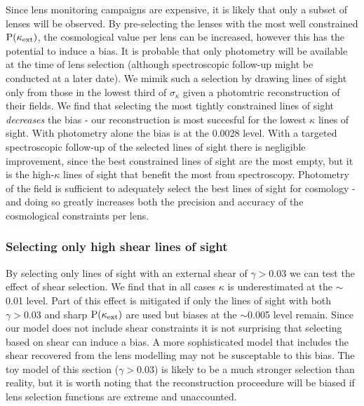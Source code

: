 \documentclass[useAMS,usenatbib]{mn2e}
\begin{document}
Since lens monitoring campaigns are expensive, it is likely that only a subset of lenses will be observed. By pre-selecting the lenses with the most well constrained ${\rm P}(\kappa_{\rm ext})$, the cosmological value per lens can be increased, however this has the potential to induce a bias. It is probable that only photometry will be available at the time of lens selection (although spectroscopic follow-up might be conducted at a later date). We mimik such a selection by drawing lines of sight only from those in the lowest third of $\sigma_{\kappa}$ given a photomtric reconstruction of their fields. We find that selecting the most tightly constrained lines of sight {\it decreases} the bias - our reconstruction is most succesful for the lowest $\kappa$ lines of sight. With photometry alone the bias is at the 0.0028 level. With a targeted spectroscopic follow-up of the selected lines of sight there is negligible improvement, since the best constrained lines of sight are the most empty, but it is the high-$\kappa$ lines of sight that benefit the most from spectroscopy. Photometry of the field is sufficient to adequately select the best lines of sight for cosmology - and doing so greatly increases both the precision and accuracy of the cosmological constraints per lens.

\subsubsection{Selecting only high shear lines of sight}

By selecting only lines of sight with an external shear of $\gamma>0.03$ we can test the effect of shear selection. We find that in all cases $\kappa$ is underestimated at the $\sim$0.01 level. Part of this effect is mitigated if only the lines of sight with both $\gamma>0.03$ and sharp ${\rm P}(\kappa_{\rm ext})$ are used but biases at the $\sim$0.005 level remain. Since our model does not include shear constraints it is not surprising that selecting based on shear can induce a bias. A more sophisticated model that includes the shear recovered from the lens modelling may not be susceptable to this bias. The toy model of this section ($\gamma>0.03$) is likely to be a much stronger selection than reality, but it is worth noting that the reconstruction proceedure will be biased if lens selection functions are extreme and unaccounted.
\end{document}
